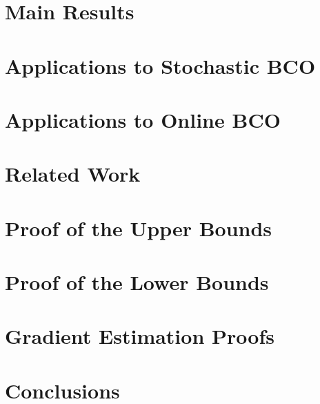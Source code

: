 \documentclass[twoside,11pt]{article}
\begin{document}
\section{Main Results}
\label{sec:results}


\section{Applications to Stochastic BCO}
\label{sec:sbco}


\section{Applications to Online BCO}
\label{sec:obco}


\section{Related Work}
\label{sec:related}



%

\section{Proof of the Upper Bounds}
\label{sec:appendix-md}


\section{Proof of the Lower Bounds}
\label{sec:appendix-lb-proof}


\section{Gradient Estimation Proofs}
\label{sec:appendix-grad}



\section{Conclusions}
\label{sec:conc}


\appendix



\end{document}
